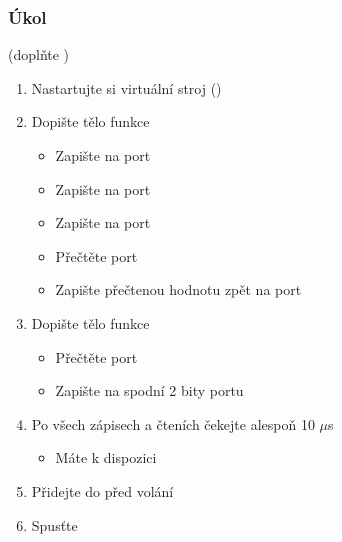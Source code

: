 \iffimuni
\begin{frame}
  \frametitle{Úkol}

   (doplňte
    )
  \begin{enumerate}
    \item Nastartujte si virtuální stroj ()
    \item Dopište tělo funkce 
    \begin{itemize}
      \item Zapište  na port 
      \item Zapište  na port 
      \item Zapište  na port 
      \item Přečtěte port 
      \item Zapište přečtenou hodnotu  zpět na port 
    \end{itemize}

    \item Dopište tělo funkce 
    \begin{itemize}
      \item Přečtěte port 
      \item Zapište  na spodní 2 bity portu 
    \end{itemize}

    \item Po všech zápisech a čteních čekejte alespoň 10 $\mu$s
    \begin{itemize}
      \item Máte k dispozici 
    \end{itemize}

    \item Přidejte do  před  volání 
    \item Spusťte
  \end{enumerate}

\end{frame}

\fi





